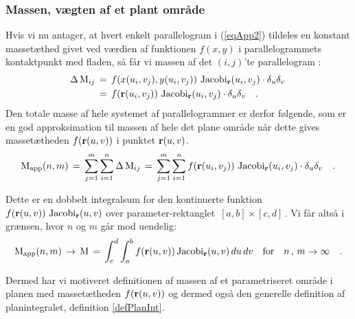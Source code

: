 \subsubsection{Massen, vægten af et plant område} \label{subsecMassPlant}

Hvis vi nu antager, at
hvert enkelt parallelogram i (\ref{eqApp2})
tildeles en konstant massetæthed givet ved
værdien af funktionen $f(x,y)$ i
parallelogrammets kontaktpunkt med fladen, så får
vi massen af det $(i, j)$'te parallelogram :
\begin{equation}
\begin{aligned}
\Delta \operatorname{M}_{ij} \, &= \, f(x(u_{i}, v_{j}), y(u_{i}, v_{j})) \, \operatorname{Jacobi}_{\bf r}(u_{i}, v_{j}) \cdot\delta_{u} \delta_{v} \, \\
&= \, f( {\bf r}(u_{i}, v_{j})) \, \operatorname{Jacobi}_{\bf r}(u_{i}, v_{j})
\cdot\delta_{u} \delta_{v}\quad .
\end{aligned}
\end{equation}
Den totale masse af hele systemet af
parallelogrammer er derfor følgende, som er en
god ap\-proksimation til massen af hele det plane område
når dette gives massetætheden $f({\bf r}(u,v))$ i
punktet ${\bf r}(u,v)$.
\begin{equation}
\operatorname{M}_{\operatorname{app}}(n,m) \, = \,  \sum_{j=1}^{m} \sum_{i=1}^{n} \Delta \operatorname{M}_{ij} \,
= \, \sum_{j=1}^{m}\sum_{i=1}^{n}f({\bf r}(u_{i},
v_{j}))\,\operatorname{Jacobi}_{\bf r}(u_{i}, v_{j}) \cdot \delta_{u} \delta_{v}
\quad .
\end{equation}

Dette er en dobbelt integralsum for den kontinuerte funktion $f({\bf
r}(u,v))\,\operatorname{Jacobi}_{\bf r}(u, v)$ over parameter-rektanglet $\,[a,
b]\times[c, d]\,$. Vi får altså i grænsen, hvor $n$ og $m$ går mod
uendelig:
\begin{equation}
\operatorname{M}_{\operatorname{app}}(n,m)\, \to \, \operatorname{M} \, = \, \int_{c}^{d}\int_{a}^{b}f({\bf r}(u,
v ))\operatorname{Jacobi}_{\bf r}(u, v)\,du \,dv \quad \text{for} \quad n\, , \, m \to
\infty \quad.
\end{equation}

Dermed har vi motiveret definitionen af massen af et
parametriseret område i planen  med massetætheden $f({\bf r}(u, v))$ og
dermed også den generelle definition af planintegralet,
definition \ref{defPlanInt}.





